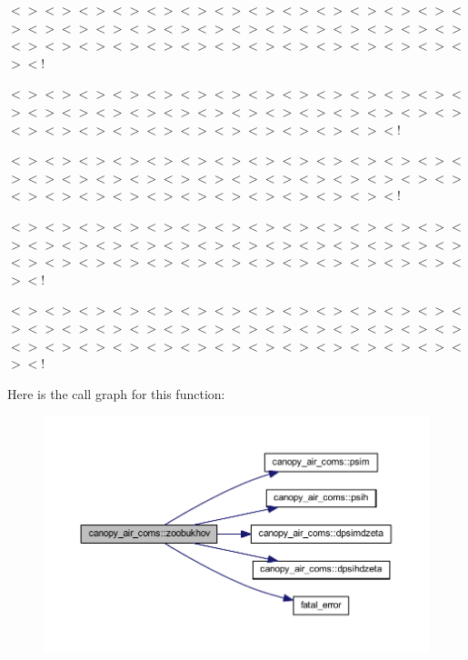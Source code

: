 $<$$>$$<$$>$$<$$>$$<$$>$$<$$>$$<$$>$$<$$>$$<$$>$$<$$>$$<$$>$$<$$>$$<$$>$$<$$>$$<$$>$$<$$>$$<$$>$$<$$>$$<$$>$$<$$>$$<$$>$$<$$>$$<$$>$$<$$>$$<$$>$$<$$>$$<$$>$$<$$>$$<$$>$$<$$>$$<$$>$$<$$>$$<$$>$$<$$>$$<$$>$$<$$>$$<$$>$$<$$>$$<$$>$$<$$>$$<$$>$$<$$>$$<$!

$<$$>$$<$$>$$<$$>$$<$$>$$<$$>$$<$$>$$<$$>$$<$$>$$<$$>$$<$$>$$<$$>$$<$$>$$<$$>$$<$$>$$<$$>$$<$$>$$<$$>$$<$$>$$<$$>$$<$$>$$<$$>$$<$$>$$<$$>$$<$$>$$<$$>$$<$$>$$<$$>$$<$$>$$<$$>$$<$$>$$<$$>$$<$$>$$<$$>$$<$$>$$<$$>$$<$$>$$<$$>$$<$$>$$<$!

$<$$>$$<$$>$$<$$>$$<$$>$$<$$>$$<$$>$$<$$>$$<$$>$$<$$>$$<$$>$$<$$>$$<$$>$$<$$>$$<$$>$$<$$>$$<$$>$$<$$>$$<$$>$$<$$>$$<$$>$$<$$>$$<$$>$$<$$>$$<$$>$$<$$>$$<$$>$$<$$>$$<$$>$$<$$>$$<$$>$$<$$>$$<$$>$$<$$>$$<$$>$$<$$>$$<$$>$$<$$>$$<$$>$$<$!

$<$$>$$<$$>$$<$$>$$<$$>$$<$$>$$<$$>$$<$$>$$<$$>$$<$$>$$<$$>$$<$$>$$<$$>$$<$$>$$<$$>$$<$$>$$<$$>$$<$$>$$<$$>$$<$$>$$<$$>$$<$$>$$<$$>$$<$$>$$<$$>$$<$$>$$<$$>$$<$$>$$<$$>$$<$$>$$<$$>$$<$$>$$<$$>$$<$$>$$<$$>$$<$$>$$<$$>$$<$$>$$<$$>$$<$$>$$<$$>$$<$$>$$<$!

$<$$>$$<$$>$$<$$>$$<$$>$$<$$>$$<$$>$$<$$>$$<$$>$$<$$>$$<$$>$$<$$>$$<$$>$$<$$>$$<$$>$$<$$>$$<$$>$$<$$>$$<$$>$$<$$>$$<$$>$$<$$>$$<$$>$$<$$>$$<$$>$$<$$>$$<$$>$$<$$>$$<$$>$$<$$>$$<$$>$$<$$>$$<$$>$$<$$>$$<$$>$$<$$>$$<$$>$$<$$>$$<$$>$$<$$>$$<$$>$$<$$>$$<$! 

Here is the call graph for this function\+:\nopagebreak
\begin{figure}[H]
\begin{center}
\leavevmode
\includegraphics[width=350pt]{namespacecanopy__air__coms_a6062471b3381c283205ea8b27383a5e0_cgraph}
\end{center}
\end{figure}


